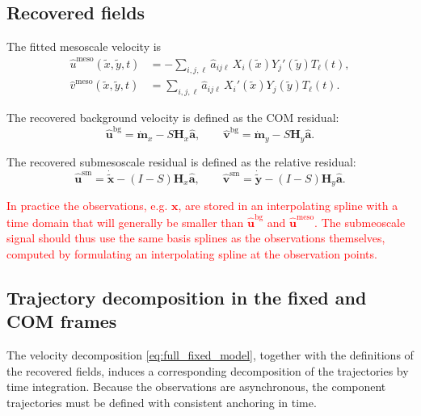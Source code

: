 \documentclass{article}
\begin{document}
\subsection{Recovered fields}

The fitted mesoscale velocity is
\begin{align}
\hat{u}^{\mathrm{meso}}(\tilde{x},\tilde{y},t)
&=
-\sum_{i,j,\ell}\hat{a}_{ij\ell}\,X_i(\tilde{x})Y_j'(\tilde{y})T_\ell(t),
\\
\hat{v}^{\mathrm{meso}}(\tilde{x},\tilde{y},t)
&=
\sum_{i,j,\ell}\hat{a}_{ij\ell}\,X_i'(\tilde{x})Y_j(\tilde{y})T_\ell(t).
\end{align}

The recovered background velocity is defined as the COM residual:
\begin{equation}
\hat{\mathbf{u}}^{\mathrm{bg}}
=
\dot{\mathbf{m}}_x
-
S\mathbf{H}_x\hat{\mathbf a},
\qquad
\hat{\mathbf{v}}^{\mathrm{bg}}
=
\dot{\mathbf{m}}_y
-
S\mathbf{H}_y\hat{\mathbf a}.
\end{equation}

The recovered submesoscale residual is defined as the relative residual:
\begin{equation}
\hat{\mathbf{u}}^{\mathrm{sm}}
=
\dot{\tilde{\mathbf{x}}}
-
(I-S)\mathbf{H}_x\hat{\mathbf a},
\qquad
\hat{\mathbf{v}}^{\mathrm{sm}}
=
\dot{\tilde{\mathbf{y}}}
-
(I-S)\mathbf{H}_y\hat{\mathbf a}.
\end{equation}

\textcolor{red}{In practice the observations, e.g. $\mathbf{x}$, are stored in an interpolating spline with a time domain that will generally be smaller than $\hat{\mathbf{u}}^{\mathrm{bg}}$ and  $\hat{\mathbf{u}}^{\mathrm{meso}}$. The submeoscale signal should thus use the same basis splines as the observations themselves, computed by formulating an interpolating spline at the observation points.}

\subsection{Trajectory decomposition in the fixed and COM frames}

The velocity decomposition \eqref{eq:full_fixed_model}, together with the
definitions of the recovered fields, induces a corresponding decomposition
of the trajectories by time integration. Because the observations are
asynchronous, the component trajectories must be defined with consistent
anchoring in time.
\end{document}
